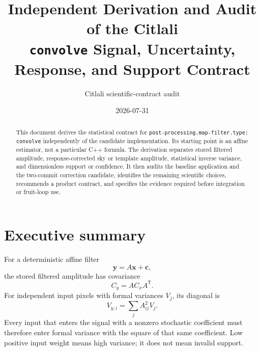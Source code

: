 \documentclass[11pt]{article}
\title{Independent Derivation and Audit of the Citlali\\
\texttt{convolve} Signal, Uncertainty, Response, and Support Contract}
\author{Citlali scientific-contract audit}
\date{2026-07-31}
\newcommand{\code}[1]{\nolinkurl{#1}}
\begin{document}
\maketitle

\begin{abstract}
This document derives the statistical contract for
\code{post-processing.map-filter.type: convolve} independently of the
candidate implementation.  Its starting point is an affine estimator, not a
particular C++ formula.  The derivation separates stored filtered amplitude,
response-corrected sky or template amplitude, statistical inverse variance,
and dimensionless support or confidence.  It then audits the baseline
application and the two-commit correction candidate, identifies the remaining
scientific choices, recommends a product contract, and specifies the evidence
required before integration or fruit-loop use.
\end{abstract}

\tableofcontents

\section{Executive summary}
\label{sec:summary}

For a deterministic affine filter
\begin{equation}
  \boldsymbol y = A\boldsymbol x+\boldsymbol c,
  \label{eq:affine}
\end{equation}
the stored filtered amplitude has covariance
\begin{equation}
  C_y=A C_x A^{\mathsf T}.
  \label{eq:affine-cov}
\end{equation}
For independent input pixels with formal variances $V_j$, its diagonal is
\begin{equation}
  V_{y,i}=\sum_j A_{ij}^2V_j.
  \label{eq:diagonal-propagation}
\end{equation}
Every input that enters the signal with a nonzero stochastic coefficient must
therefore enter formal variance with the square of that same coefficient.
Low positive input weight means high variance; it does not mean invalid
support.
\end{document}
